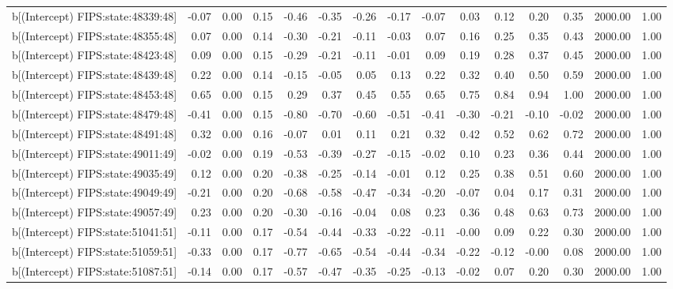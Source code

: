 \begin{table}[ht]
\begin{tabular}{rrrrrrrrrrrrrrr}
  b[(Intercept) FIPS:state:48339:48] & -0.07 & 0.00 & 0.15 & -0.46 & -0.35 & -0.26 & -0.17 & -0.07 & 0.03 & 0.12 & 0.20 & 0.35 & 2000.00 & 1.00 \\ 
  b[(Intercept) FIPS:state:48355:48] & 0.07 & 0.00 & 0.14 & -0.30 & -0.21 & -0.11 & -0.03 & 0.07 & 0.16 & 0.25 & 0.35 & 0.43 & 2000.00 & 1.00 \\ 
  b[(Intercept) FIPS:state:48423:48] & 0.09 & 0.00 & 0.15 & -0.29 & -0.21 & -0.11 & -0.01 & 0.09 & 0.19 & 0.28 & 0.37 & 0.45 & 2000.00 & 1.00 \\ 
  b[(Intercept) FIPS:state:48439:48] & 0.22 & 0.00 & 0.14 & -0.15 & -0.05 & 0.05 & 0.13 & 0.22 & 0.32 & 0.40 & 0.50 & 0.59 & 2000.00 & 1.00 \\ 
  b[(Intercept) FIPS:state:48453:48] & 0.65 & 0.00 & 0.15 & 0.29 & 0.37 & 0.45 & 0.55 & 0.65 & 0.75 & 0.84 & 0.94 & 1.00 & 2000.00 & 1.00 \\ 
  b[(Intercept) FIPS:state:48479:48] & -0.41 & 0.00 & 0.15 & -0.80 & -0.70 & -0.60 & -0.51 & -0.41 & -0.30 & -0.21 & -0.10 & -0.02 & 2000.00 & 1.00 \\ 
  b[(Intercept) FIPS:state:48491:48] & 0.32 & 0.00 & 0.16 & -0.07 & 0.01 & 0.11 & 0.21 & 0.32 & 0.42 & 0.52 & 0.62 & 0.72 & 2000.00 & 1.00 \\ 
  b[(Intercept) FIPS:state:49011:49] & -0.02 & 0.00 & 0.19 & -0.53 & -0.39 & -0.27 & -0.15 & -0.02 & 0.10 & 0.23 & 0.36 & 0.44 & 2000.00 & 1.00 \\ 
  b[(Intercept) FIPS:state:49035:49] & 0.12 & 0.00 & 0.20 & -0.38 & -0.25 & -0.14 & -0.01 & 0.12 & 0.25 & 0.38 & 0.51 & 0.60 & 2000.00 & 1.00 \\ 
  b[(Intercept) FIPS:state:49049:49] & -0.21 & 0.00 & 0.20 & -0.68 & -0.58 & -0.47 & -0.34 & -0.20 & -0.07 & 0.04 & 0.17 & 0.31 & 2000.00 & 1.00 \\ 
  b[(Intercept) FIPS:state:49057:49] & 0.23 & 0.00 & 0.20 & -0.30 & -0.16 & -0.04 & 0.08 & 0.23 & 0.36 & 0.48 & 0.63 & 0.73 & 2000.00 & 1.00 \\ 
  b[(Intercept) FIPS:state:51041:51] & -0.11 & 0.00 & 0.17 & -0.54 & -0.44 & -0.33 & -0.22 & -0.11 & -0.00 & 0.09 & 0.22 & 0.30 & 2000.00 & 1.00 \\ 
  b[(Intercept) FIPS:state:51059:51] & -0.33 & 0.00 & 0.17 & -0.77 & -0.65 & -0.54 & -0.44 & -0.34 & -0.22 & -0.12 & -0.00 & 0.08 & 2000.00 & 1.00 \\ 
  b[(Intercept) FIPS:state:51087:51] & -0.14 & 0.00 & 0.17 & -0.57 & -0.47 & -0.35 & -0.25 & -0.13 & -0.02 & 0.07 & 0.20 & 0.30 & 2000.00 & 1.00 \\ 

\end{tabular}
\end{table}
